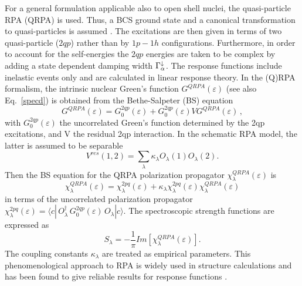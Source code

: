 For a general formulation applicable also to open shell nuclei, the
quasi-particle RPA (QRPA) is used. Thus, a BCS%
 ground state and a canonical transformation to quasi-particles
is assumed \cite{RS}. The excitations are then given in terms of two
quasi-particle ($2qp$) rather than by $1p-1h$ configurations. Furthermore,
in order to account for the self-energies the $2qp$ energies are taken to be
complex by adding a state dependent damping width $\Gamma_{\alpha}^{%
\downarrow}$. The response functions include inelastic events only and are
calculated in linear response theory. In the (Q)RPA formalism, the intrinsic
nuclear Green's function $G^{QRPA}(\varepsilon)$ (see also Eq.~\ref{specd}) is
obtained from the Bethe-Salpeter (BS) equation \cite{Wal}
\begin{equation}
G^{QRPA}(\varepsilon) = G_{0}^{2qp}(\varepsilon)+
G_{0}^{2qp}(\varepsilon)VG^{QRPA}(\varepsilon)\,,  \label{bs1}
\end{equation}
with $G_{0}^{2qp}(\varepsilon)$ the uncorrelated Green's function determined
by the 2qp excitations, and V the residual 2qp interaction. In the
schematic RPA model, the latter is assumed to be separable
\begin{equation}
V^{res}(1,2)=\sum_{\lambda}\kappa _{\lambda}O_{\lambda}(1)O_{\lambda}(2).
\end{equation}
Then the BS equation for the QRPA polarization propagator $%
\chi_{\lambda}^{QRPA}(\varepsilon)$ is \cite{Lenske:01}
\begin{equation}
\chi_{\lambda}^{QRPA}(\varepsilon)= \chi_{\lambda}^{2pq}(\varepsilon) +
\kappa_{\lambda}\chi_{\lambda}^{2pq}(\varepsilon)\chi_{\lambda}^{QRPA}(%
\varepsilon)  \label{bs2}
\end{equation}
in terms of the uncorrelated polarization propagator $\chi_{\lambda}^{2pq}
(\varepsilon) = \langle c|\,O_{\lambda}^{\dagger }\,G_{0}^{2qp}(\varepsilon
)\,O_{\lambda}|c\rangle$. The spectroscopic strength functions are expressed
as
\begin{equation}
S_{\lambda} =-%
\frac{1}{\pi}Im[\chi_{\lambda}^{QRPA}(\varepsilon)].  \label{sprpa}
\end{equation}
The coupling constants $\kappa_{\lambda}$ are treated as empirical
parameters. This phenomenological approach to RPA%
 is widely used in structure calculations and has been found to
give reliable results for response functions \cite{BM,Solv}.


